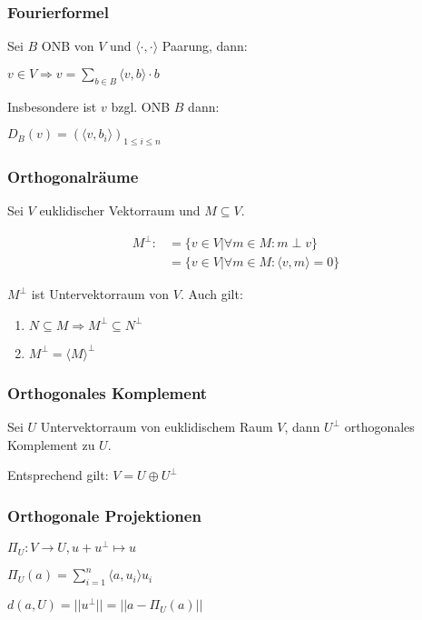 \subsubsection*{Fourierformel}

Sei $B$ ONB von $V$ und $\langle \cdot, \cdot \rangle$ Paarung, dann:

$v \in V \Rightarrow v = \sum_{b\in B} \langle v, b \rangle \cdot b$

Insbesondere ist $v$ bzgl. ONB $B$ dann:

$D_B(v) = (\langle v, b_i\rangle)_{1\leq i \leq n}$

\subsubsection*{Orthogonalräume}

Sei $V$ euklidischer Vektorraum und $M \subseteq V$.

\begin{equation*}
	\begin{aligned}
		M^{\perp} :&= \{v \in V | \forall m \in M : m \perp v \} \\
		           &= \{v \in V | \forall m \in M : \langle v, m \rangle = 0\}
	\end{aligned}
\end{equation*}

$M^{\perp}$ ist Untervektorraum von $V$. Auch gilt:

\begin{enumerate}[label=(\alph*)]
	\item $N \subseteq M \Rightarrow M^{\perp} \subseteq N^{\perp}$
	\item $M^{\perp} = \langle M \rangle ^{\perp}$
\end{enumerate}

\subsubsection*{Orthogonales Komplement}

Sei $U$ Untervektorraum von euklidischem Raum $V$, dann $U^\perp$ orthogonales Komplement zu $U$.

Entsprechend gilt: $V = U \oplus U^\perp$

\subsubsection*{Orthogonale Projektionen}

\begin{description}[leftmargin=!,labelwidth=20mm]
	\item[Definition] $\Pi_U : V \rightarrow U, u + u^\perp \mapsto u$
	\item[Bestimmung] $\Pi_U(a) = \sum_{i=1}^n \langle a,u_i \rangle u_i$
	\item[Abstand]    $d(a, U) = ||u^\perp|| = ||a - \Pi_U(a)||$
\end{description}

